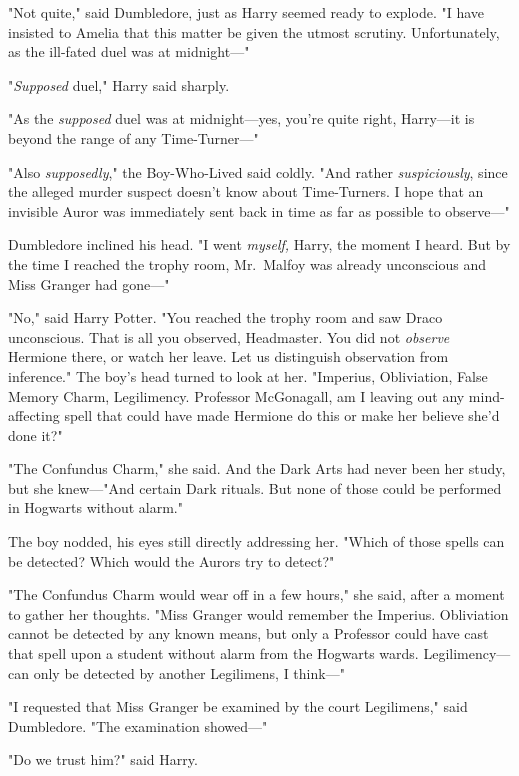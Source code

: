"Not quite," said Dumbledore, just as Harry seemed ready to explode. "I have
insisted to Amelia that this matter be given the utmost scrutiny.
Unfortunately, as the ill-fated duel was at midnight\mbox{---}"

"\emph{Supposed} duel," Harry said sharply.

"As the \emph{supposed} duel was at midnight---yes, you're quite right,
Harry---it is beyond the range of any Time-Turner\mbox{---}"

"Also \emph{supposedly}," the Boy-Who-Lived said coldly. "And rather
\emph{suspiciously}, since the alleged murder suspect doesn't know about
Time-Turners. I hope that an invisible Auror was immediately sent back in time
as far as possible to observe\mbox{---}"

Dumbledore inclined his head. "I went \emph{myself,} Harry, the moment I heard.
But by the time I reached the trophy room, Mr.~Malfoy was already unconscious
and Miss Granger had gone\mbox{---}"

"No," said Harry Potter. "You reached the trophy room and saw Draco
unconscious. That is all you observed, Headmaster. You did not \emph{observe}
Hermione there, or watch her leave. Let us distinguish observation from
inference." The boy's head turned to look at her. "Imperius, Obliviation, False
Memory Charm, Legilimency. Professor McGonagall, am I leaving out any
mind-affecting spell that could have made Hermione do this or make her believe
she'd done it?"

"The Confundus Charm," she said. And the Dark Arts had never been her study,
but she knew\mbox{---}"And certain Dark rituals. But none of those could be performed
in Hogwarts without alarm."

The boy nodded, his eyes still directly addressing her. "Which of those spells
can be detected? Which would the Aurors try to detect?"

"The Confundus Charm would wear off in a few hours," she said, after a moment
to gather her thoughts. "Miss Granger would remember the Imperius. Obliviation
cannot be detected by any known means, but only a Professor could have cast
that spell upon a student without alarm from the Hogwarts wards.
Legilimency---can only be detected by another Legilimens, I think\mbox{---}"

"I requested that Miss Granger be examined by the court Legilimens," said
Dumbledore. "The examination showed\mbox{---}"

"Do we trust him?" said Harry.

